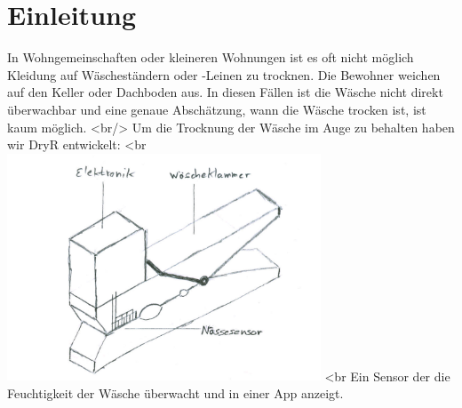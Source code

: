 \usepackage {picins}
\section{Einleitung}
\begin{description}
	In Wohngemeinschaften oder kleineren Wohnungen ist es oft nicht möglich Kleidung auf Wäscheständern oder -Leinen zu trocknen. Die Bewohner weichen auf den Keller oder Dachboden aus. In diesen Fällen ist die Wäsche nicht direkt überwachbar und eine genaue Abschätzung, wann die Wäsche trocken ist, ist kaum möglich. <br/>
Um die Trocknung der Wäsche im Auge zu behalten haben wir DryR entwickelt: <br\>
\includegraphics[width=0.7\textwidth]{01-klammer.png} <br\>
Ein Sensor der die Feuchtigkeit der Wäsche überwacht und in einer App anzeigt.

\end{description}
